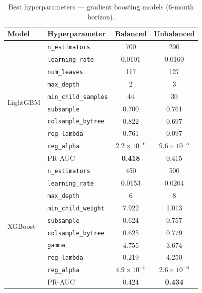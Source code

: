 \begin{table}[ht!]
\centering
\caption[Best hyperparameters: gradient boosting models]{Best hyperparameters --- gradient boosting models (6-month horizon).}
\label{tab:best_boosting}
\small
\begin{tabular}{l l c c}
\toprule
\textbf{Model} & \textbf{Hyperparameter} & \textbf{Balanced} & \textbf{Unbalanced} \\
\midrule
\multirow{10}{*}{LightGBM}
  & \texttt{n\_estimators}       & 700     & 200 \\
  & \texttt{learning\_rate}      & 0.0101  & 0.0160 \\
  & \texttt{num\_leaves}         & 117     & 127 \\
  & \texttt{max\_depth}          & 2       & 3 \\
  & \texttt{min\_child\_samples} & 44      & 30 \\
  & \texttt{subsample}           & 0.700   & 0.761 \\
  & \texttt{colsample\_bytree}   & 0.822   & 0.697 \\
  & \texttt{reg\_lambda}         & 0.761   & 0.097 \\
  & \texttt{reg\_alpha}          & $2.2 \times 10^{-6}$ & $9.6 \times 10^{-5}$ \\
  & PR-AUC                       & \textbf{0.418} & 0.415 \\
\midrule
\multirow{10}{*}{XGBoost}
  & \texttt{n\_estimators}       & 450     & 500 \\
  & \texttt{learning\_rate}      & 0.0153  & 0.0204 \\
  & \texttt{max\_depth}          & 6       & 8 \\
  & \texttt{min\_child\_weight}  & 7.922   & 1.013 \\
  & \texttt{subsample}           & 0.624   & 0.757 \\
  & \texttt{colsample\_bytree}   & 0.625   & 0.779 \\
  & \texttt{gamma}               & 4.755   & 3.674 \\
  & \texttt{reg\_lambda}         & 0.219   & 4.250 \\
  & \texttt{reg\_alpha}          & $4.9 \times 10^{-5}$ & $2.6 \times 10^{-6}$ \\
  & PR-AUC                       & 0.424   & \textbf{0.434} \\
\bottomrule
\end{tabular}
\end{table}

\clearpage
